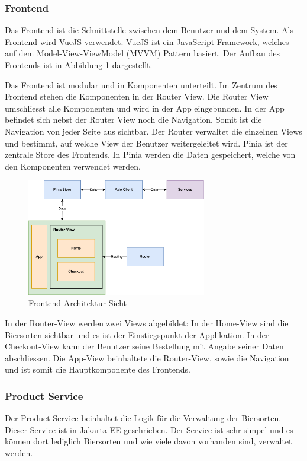 \subsubsection{Frontend}
\label{subsubsec:Frontend}
Das Frontend ist die Schnittstelle zwischen dem Benutzer und dem System. Als Frontend wird VueJS verwendet. VueJS ist ein JavaScript Framework, welches auf dem Model-View-ViewModel (MVVM) Pattern basiert. Der Aufbau des Frontends ist in Abbildung \ref{fig:frontend} dargestellt.

Das Frontend ist modular und in Komponenten unterteilt. Im Zentrum des Frontend stehen die Komponenten
in der Router View. Die Router View umschliesst alle Komponenten und wird in der App eingebunden. In der
App befindet sich nebst der Router View noch die Navigation. Somit ist die Navigation von jeder Seite aus
sichtbar.
Der Router verwaltet die einzelnen Views und bestimmt, auf welche View der Benutzer weitergeleitet wird.
Pinia ist der zentrale Store des Frontends. In Pinia werden die Daten gespeichert, welche von den Komponenten verwendet werden.

\begin{figure}[H]
    \centering
    \includegraphics[width=0.7\textwidth]{../images/bausteinsicht/frontend.png}
    \caption{Frontend Architektur Sicht}
    \label{fig:frontend}
\end{figure}

In der Router-View werden zwei Views abgebildet: In der Home-View sind die Biersorten sichtbar und es ist der Einstiegspunkt der Applikation. In der Checkout-View kann der Benutzer seine Bestellung mit Angabe seiner Daten abschliessen.
Die App-View beinhaltete die Router-View, sowie die Navigation und ist somit die Hauptkomponente des Frontends. 


\subsubsection{Product Service}
\label{subsubsec:ProductService}
Der Product Service beinhaltet die Logik für die Verwaltung der Biersorten. Dieser Service ist in Jakarta EE geschrieben. Der Service ist sehr simpel und es können dort lediglich Biersorten und wie viele davon vorhanden sind, verwaltet werden.

